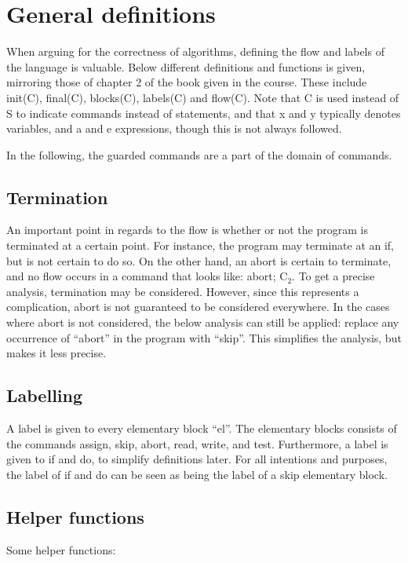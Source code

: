 \section{General definitions}
When arguing for the correctness of algorithms, defining the flow and labels of the language is
valuable. Below different definitions and functions is given, mirroring those of chapter 2 of the
book given in the course. These include init(C), final(C), blocks(C), labels(C) and flow(C).
Note that C is used instead of S to indicate commands instead of statements, and that
x and y typically denotes variables, and a and e expressions, though this is not always followed.

In the following, the guarded commands are a part of the domain of commands.

\subsection{Termination}

An important point in regards to the flow is whether or not the program is terminated
at a certain point. For instance, the program may terminate at an if, but is not
certain to do so. On the other hand, an abort is certain to terminate, and no flow
occurs in a command that looks like: abort; C$_2$. To get a precise analysis, termination
may be considered. However, since this represents a complication, abort is not guaranteed
to be considered everywhere. In the cases where abort is not considered, the below analysis
can still be applied: replace any occurrence of ``abort'' in the program with ``skip''.
This simplifies the analysis, but makes it less precise.

\subsection{Labelling}

A label is given to every elementary block ``el''. The elementary blocks consists of
the commands assign, skip, abort, read, write, and test. Furthermore, a label is given
to if and do, to simplify definitions later. For all intentions and purposes, the
label of if and do can be seen as being the label of a skip elementary block.

\subsection{Helper functions}

Some helper functions:

